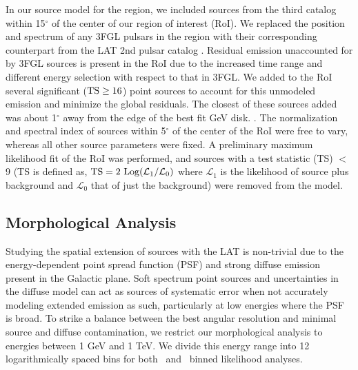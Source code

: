 In our source model for the region, we included sources from the third \FermiLat catalog \citep[3FGL]{3FGL} within 15$^\circ$ of the center of our region of interest (RoI). We replaced the position and spectrum of any 3FGL pulsars in the region with their corresponding counterpart  from the LAT 2nd pulsar catalog \citep{2PC}.  Residual emission unaccounted for by 3FGL sources is present in the RoI due to the increased time range and different energy selection with respect to that in 3FGL. We added to the RoI several significant (${\rm TS \geq 16}$) point sources to account for this unmodeled emission and minimize the global residuals. The closest of these sources added was about 1$^{\circ}$ away from the edge of the best fit GeV disk. .  The normalization and spectral index of sources within 5$^{\circ}$ of the center of the RoI were free to vary, whereas all other source parameters were fixed. A preliminary maximum likelihood fit of the RoI was performed, and  sources with a test statistic (TS) $<$ 9 (TS is defined as,  ${\rm TS}=2~{\rm Log}(\mathcal{L}_1 / \mathcal{L}_0)$ where $\mathcal{L}_1$ 
 is the likelihood of source plus background and  $\mathcal{L}_0$ that of just the background) were removed from the model. 

\subsection{Morphological Analysis}\label{sec:LATmorph}
Studying the spatial extension of sources with the LAT is non-trivial due to the energy-dependent point spread function (PSF) and strong diffuse emission present in the Galactic plane. Soft spectrum point sources and uncertainties in the diffuse model can act as sources of systematic error when not accurately modeling extended emission as such, particularly at low energies where the PSF is broad. To strike a balance between the best angular resolution and minimal source and diffuse contamination, we restrict our morphological analysis to energies between 1 GeV and 1 TeV. We divide this energy range into 12  logarithmically spaced bins for both \ptlike~and \gtlike~binned likelihood analyses. 

